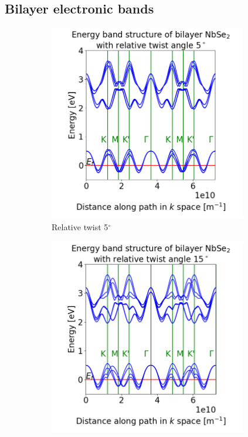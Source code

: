 \documentclass[12pt]{report} %
\begin{document}
\subsection*{Bilayer electronic bands}
%
\begin{figure}[t!]
\centering
  \begin{subfigure}[b]{0.475\textwidth}
    \centering
    \includegraphics[width=0.95\textwidth]{bilayer_bands_5.png}
    \caption{
      Relative twist 5$^\circ$
    }
    \label{bilayer_bands_5}
  \end{subfigure}
  \hfill
  \begin{subfigure}[b]{0.475\textwidth}
    \centering
    \includegraphics[width=0.95\textwidth]{bilayer_bands_15.png}

\end{subfigure}
\end{figure}
\end{document}

